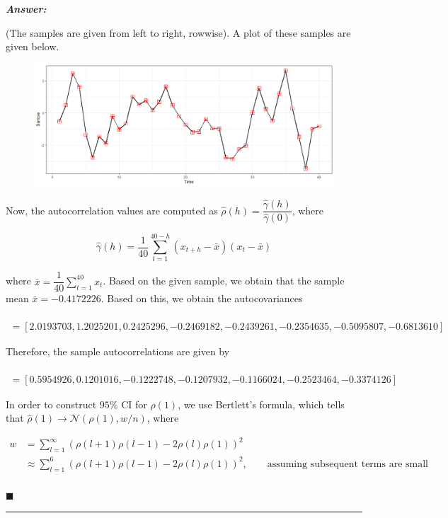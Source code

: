 \documentclass[12pt]{article}
\theoremstyle{definition}
\newenvironment{answer}{
    \textbf{\textit{Answer:}} \qquad
}{\hfill $\blacksquare$ \\ \begin{center}
    \rule{0.6\linewidth}{0.5px}    
\end{center}
}
\begin{document}
\begin{answer}
    (The samples are given from left to right, rowwise). A plot of these samples are given below.

    \begin{figure}[H]
        \centering
        \includegraphics[width = \linewidth]{arma_samples.png}
    \end{figure}

    Now, the autocorrelation values are computed as $\widehat{\rho}(h) = \dfrac{\widehat{\gamma}(h)}{\widehat{\gamma}(0)}$, where 

    $$
    \widehat{\gamma}(h) = \dfrac{1}{40}\sum_{t = 1}^{40 - h} (x_{t+h} - \bar{x})(x_t - \bar{x})
    $$

    where $\bar{x} = \dfrac{1}{40} \sum_{t = 1}^{40} x_t$. Based on the given sample, we obtain that the sample mean $\bar{x} = -0.4172226$. Based on this, we obtain the autocovariances 
    
    \begin{multline*}
        [\widehat{\gamma}(0), \widehat{\gamma}(1), \ldots, \widehat{\gamma}(7)] \\
        = [2.0193703,  1.2025201,  0.2425296, -0.2469182, -0.2439261, -0.2354635, -0.5095807, -0.6813610]        
    \end{multline*}

    Therefore, the sample autocorrelations are given by 

    \begin{multline*}
        [\widehat{\rho}(1), \ldots \widehat{\rho}(7)]\\
        = [0.5954926,  0.1201016, -0.1222748, -0.1207932, -0.1166024, -0.2523464, -0.3374126]
    \end{multline*}


    In order to construct $95\%$ CI for $\rho(1)$, we use Bertlett's formula, which tells that $\widehat{\rho}(1) \rightarrow \mathcal{N}\left(\rho(1), w/n\right)$, where 

    \begin{align*}
        w 
        & = \sum_{l = 1}^{\infty} (\rho(l+1)\rho(l-1) - 2\rho(l)\rho(1))^2\\
        & \approx \sum_{l = 1}^{6} (\rho(l+1)\rho(l-1) - 2\rho(l)\rho(1))^2 , \qquad \text{assuming subsequent terms are small}\\
    \end{align*}


\end{answer}
\end{document}

